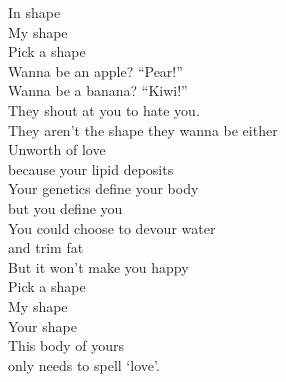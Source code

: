 In shape\\
My shape\\
Pick a shape\\
Wanna be an apple? ``Pear!''\\
Wanna be a banana? ``Kiwi!''\\
They shout at you to hate you.\\
They aren't the shape they wanna be either\\
Unworth of love\\
because your lipid deposits\\
Your genetics define your body\\
but you define you\\
You could choose to devour water\\
and trim fat\\
But it won't make you happy\\
Pick a shape\\
My shape\\
Your shape\\
This body of yours\\
only needs to spell `love'.\\

